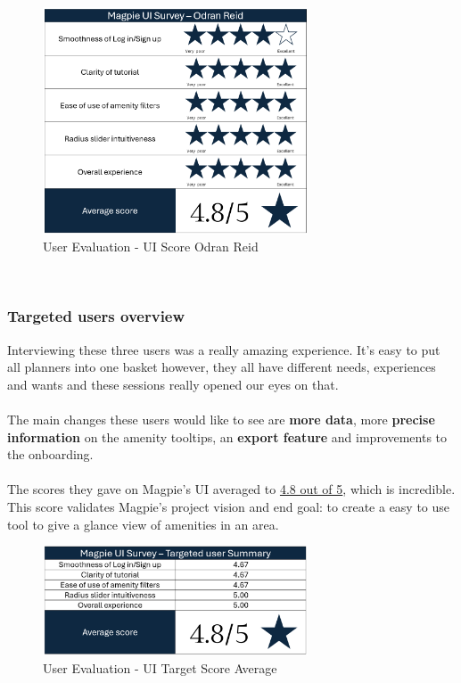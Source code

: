\begin{figure}[h!]
    \centering
    \includegraphics[width=0.7\textwidth]{images/survey-odran.png}
    \caption{User Evaluation - UI Score Odran Reid}
\end{figure}\\

\newpage
\subsubsection{Targeted users overview}
Interviewing these three users was a really amazing experience. It's easy to put all planners into one basket however, they all have different needs, experiences and wants and these sessions really opened our eyes on that.\\ \\
The main changes these users would like to see are \textbf{more data}, more \textbf{precise information} on the amenity tooltips, an \textbf{export feature} and improvements to the onboarding.\\ \\
The scores they gave on Magpie's UI averaged to \underline{4.8 out of 5}, which is incredible. This score validates Magpie's project vision and end goal: to create a easy to use tool to give a glance view of amenities in an area.
\begin{figure}[h!]
    \centering
    \includegraphics[width=0.7\textwidth]{images/survey-target-summary.png}
    \caption{User Evaluation - UI Target Score Average}
\end{figure}\\
